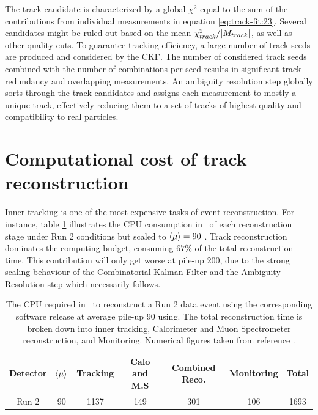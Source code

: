 The track candidate is characterized by a global $\chi^2$ equal to the sum of the contributions from individual measurements in equation \eqref{eq:track-fit:23}.
Several candidates might be ruled out based on the mean $\chi^2_{track} / \abs{M_{track}}$, as well as other quality cuts. 
To guarantee tracking efficiency, a large number of track seeds are produced and considered by the CKF.
The number of considered track seeds combined with the number of combinations per seed results in significant track redundancy and overlapping measurements. 
An ambiguity resolution step globally sorts through the track candidates and assigns each measurement to mostly a unique track, effectively reducing them to a set of tracks of highest quality and compatibility to real particles. 

\section{Computational cost of track reconstruction}
\label{sect:computational-cost-ckf}

Inner tracking is one of the most expensive tasks of event reconstruction. 
For instance, table \ref{tab:reco-time-breakdown} illustrates the CPU consumption in \hssec~of each reconstruction stage under Run 2 conditions but scaled to $\expval{\mu}=90$ \cite{CERN-LHCC-2020-015}.
Track reconstruction dominates the computing budget, consuming $67\%$ of the total reconstruction time.
This contribution will only get worse at pile-up 200, due to the strong scaling behaviour of the Combinatorial Kalman Filter and the Ambiguity Resolution step which necessarily follows.

\begin{table}[h!]
    \centering
    \begin{tabular}{|c|c||c|c|c|c||c|}
    \hline
       Detector  & $\expval{\mu}$ & Tracking & Calo and M.S & Combined Reco. & Monitoring &  Total \\
       \hline
        Run 2 & 90 & 1137 & 149 & 301 & 106 & 1693 \\ \hline
    \end{tabular}
    \caption{The CPU required in \hssec~to reconstruct a Run 2 data event using the corresponding software release at average pile-up 90 using. The total reconstruction time is broken down into inner tracking, Calorimeter and Muon Spectrometer reconstruction, and Monitoring. Numerical figures taken from reference \cite{CERN-LHCC-2020-015}.}
    \label{tab:reco-time-breakdown}
\end{table}

